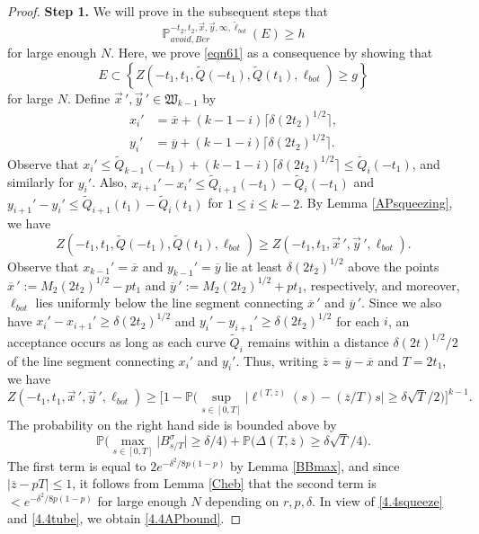 \begin{proof}
	\noindent\textbf{Step 1.} We will prove in the subsequent steps that 
		\begin{equation}\label{4.4Ebound}
		\mathbb{P}^{-t_2, t_2, \vec{x},\vec{y}, \infty, \widetilde{\ell}_{bot} }_{avoid, Ber}(E) \geq h
		\end{equation} 
		for large enough $N$. Here, we prove \eqref{eqn61} as a consequence by showing that
		\begin{equation}\label{4.4APbound}
		E \subset \left\{Z(-t_1,t_1,\widetilde{Q}(-t_1),\widetilde{Q}(t_1),\ell_{bot}) \geq g\right\}
		\end{equation}
		for large $N$. Define $\vec{x}\,', \vec{y}\,' \in \mathfrak{W}_{k-1}$ by
		\begin{align*}
		x_i' &= \overline{x} + (k-1-i)\lceil \delta(2t_2)^{1/2}\rceil,\\
		y_i' &= \overline{y} + (k-1-i)\lceil \delta(2t_2)^{1/2}\rceil.
		\end{align*}
		Observe that $x_i' \leq \widetilde{Q}_{k-1}(-t_1) + (k-1-i)\lceil \delta(2t_2)^{1/2}\rceil \leq \widetilde{Q}_i(-t_1)$, and similarly for $y_i'$. Also, $x_{i+1}' - x_i' \leq \widetilde{Q}_{i+1}(-t_1) - \widetilde{Q}_i(-t_1)$ and $y_{i+1}' - y_i' \leq \widetilde{Q}_{i+1}(t_1) - \widetilde{Q}_i(t_1)$ for $1\leq i\leq k-2$. By Lemma \ref{APsqueezing}, we have
		\begin{equation}\label{4.4squeeze}
		Z(-t_1,t_1,\widetilde{Q}(-t_1),\widetilde{Q}(t_1),\ell_{bot}) \geq Z(-t_1,t_1,\vec{x}\,', \vec{y}\,', \ell_{bot}).
		\end{equation}
		Observe that $x_{k-1}' = \overline{x}$ and $y_{k-1}' = \overline{y}$ lie at least $\delta(2t_2)^{1/2}$ above the points $\overline{x}\,' := M_2(2t_2)^{1/2} - pt_1$ and $\overline{y}\,' := M_2(2t_2)^{1/2} + pt_1$, respectively, and moreover, $\ell_{bot}$ lies uniformly below the line segment connecting $\overline{x}\,'$ and $\overline{y}\,'$. Since we also have $x_i' - x_{i+1}' \geq \delta(2t_2)^{1/2}$ and $y_i' - y_{i+1}' \geq \delta(2t_2)^{1/2}$ for each $i$, an acceptance occurs as long as each curve $\widetilde{Q}_i$ remains within a distance $\delta(2t)^{1/2}/2$ of the line segment connecting $x_i'$ and $y_i'$. Thus, writing $\overline{z} = \overline{y} - \overline{x}$ and $T = 2t_1$, we have
		\begin{equation}\label{4.4tube}
		Z(-t_1, t_1, \vec{x}\,', \vec{y}\,', \ell_{bot}) \geq \Big[1 - \mathbb{P}\Big(\sup_{s\in[0,T]}\big|\ell^{(T,\overline{z})}(s) - (\overline{z}/T)s\big| \geq \delta\sqrt{T}/2\Big)\Big]^{k-1}.
		\end{equation} 
		The probability on the right hand side is bounded above by
		\[
		\mathbb{P}\Big(\max_{s\in[0,T]} \big|B^\sigma_{s/T}\big| \geq \delta/4\Big) + \mathbb{P}\Big(\Delta(T,\overline{z}) \geq \delta\sqrt{T}/4\Big).
		\]
		The first term is equal to $2e^{-\delta^2/8p(1-p)}$ by Lemma \ref{BBmax}, and since $|\overline{z} - pT| \leq 1$, it follows from Lemma \ref{Cheb} that the second term is $< e^{-\delta^2/8p(1-p)}$ for large enough $N$ depending on $r,p,\delta$. In view of \eqref{4.4squeeze} and \eqref{4.4tube}, we obtain \eqref{4.4APbound}.
		
		\end{proof}
		
